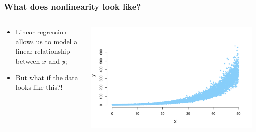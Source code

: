 \documentclass[aspectratio=169]{beamer}
\theoremstyle{principle}
\begin{document}
\begin{frame}
\frametitle{What does nonlinearity look like?}

\begin{columns}
\begin{column}{0.4\textwidth}

\begin{itemize}
\item Linear regression allows us to model a linear relationship between $x$ and $y$;
\bigskip
\bigskip
\bigskip

\item But what if the data looks like this?!

\end{itemize}

\end{column}
\begin{column}{0.6\textwidth}
\begin{center}
\includegraphics[scale=0.45]{crazy_curve_exp.pdf}
\end{center}
\end{column}
\end{columns}

\end{frame}
\end{document}
